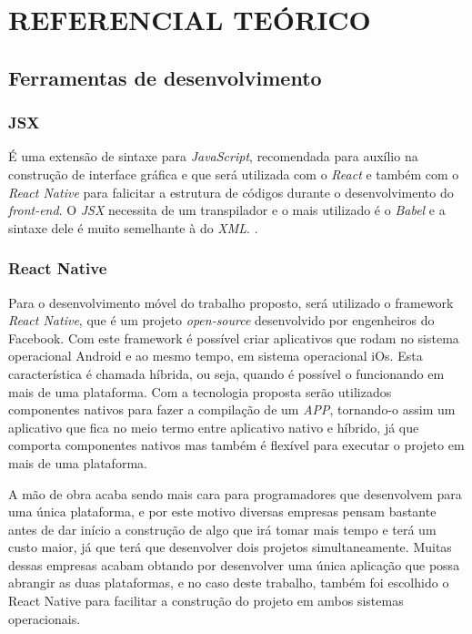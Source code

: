 
\chapter{REFERENCIAL TEÓRICO}
\label{chap:ref_teo}

\section{Ferramentas de desenvolvimento}
\subsection{JSX}

É uma extensão de sintaxe para \textit{JavaScript}, recomendada para auxílio na construção de interface gráfica e que será utilizada com o \textit{React} e também com o \textit{React Native} para falicitar a estrutura de códigos durante o desenvolvimento do \textit{front-end}. O \textit{JSX} necessita de um transpilador e o mais utilizado é o \textit{Babel} e a sintaxe dele é muito semelhante à do \textit{XML}.  
\cite{jsx}.

\subsection{React Native}

Para o desenvolvimento móvel do trabalho proposto, será utilizado o framework \textit{React Native}, que é um projeto \textit{open-source} desenvolvido por engenheiros do Facebook. Com este framework é possível criar aplicativos que rodam no sistema operacional Android e ao mesmo tempo, em sistema operacional iOs. Esta característica é chamada híbrida, ou seja, quando é possível o funcionando em mais de uma plataforma. Com a tecnologia proposta serão utilizados componentes nativos para fazer a compilação de um \textit{APP}, tornando-o assim um aplicativo que fica no meio termo entre aplicativo nativo e híbrido, já que comporta componentes nativos mas também é flexível para executar o projeto em mais de uma plataforma.

A mão de obra acaba sendo mais cara para programadores que desenvolvem para uma única plataforma, e por este motivo diversas empresas pensam bastante antes de dar início a construção de algo que irá tomar mais tempo e terá um custo maior, já que terá que desenvolver dois projetos simultaneamente. Muitas dessas empresas acabam obtando por desenvolver uma única aplicação que possa abrangir as duas plataformas, e no caso deste trabalho, também foi escolhido o React Native para facilitar a construção do projeto em ambos sistemas operacionais. 

